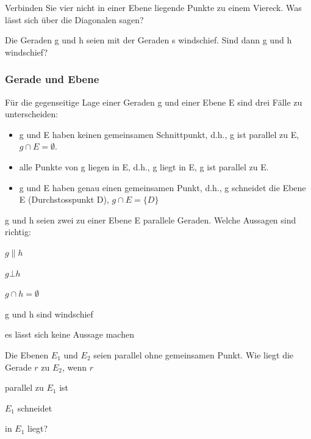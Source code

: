 \documentclass[%
11pt,%
twoside,%
titlepage,%
a4page,%
german,%
headsepline%
]{scrartcl}
\begin{document}
\begin{ueb}
Verbinden Sie vier nicht in einer Ebene liegende Punkte zu einem Viereck. Was l\"asst sich \"uber die Diagonalen sagen?
\end{ueb}
\begin{ueb}
Die Geraden g und h seien mit der Geraden s windschief. Sind dann g und h windschief?
\end{ueb}

\subsubsection{Gerade und Ebene}
F\"ur die gegenseitige Lage einer Geraden g und einer Ebene E sind drei F\"alle zu unterscheiden:
\begin{itemize}
\item g und E haben keinen gemeinsamen Schnittpunkt, d.h., g ist parallel zu E, $g\cap E=\emptyset$.
\item alle Punkte von g liegen in E, d.h., g liegt in E, g ist parallel zu E.
\item g und E haben genau einen gemeinsamen Punkt, d.h., g schneidet die Ebene E (Durchstosspunkt D), $g\cap E=\{D\}$
\end{itemize}

\begin{ueb}
g und h seien zwei zu einer Ebene E parallele Geraden. Welche Aussagen sind richtig:
\begin{enumeratea}
\item $g\| h$
\item $g\bot h$
\item $g\cap h=\emptyset$
\item g und h sind windschief
\item es l\"asst sich keine Aussage machen
\end{enumeratea}
\end{ueb}

\begin{ueb}
Die Ebenen $E_1$ und $E_2$ seien parallel ohne gemeinsamen Punkt. Wie liegt die Gerade $r$ zu $E_2$, wenn $r$
\begin{enumeratea}
\item parallel zu $E_1$ ist
\item $E_1$ schneidet
\item in $E_1$ liegt?
\end{enumeratea}
\end{ueb}
\end{document}
